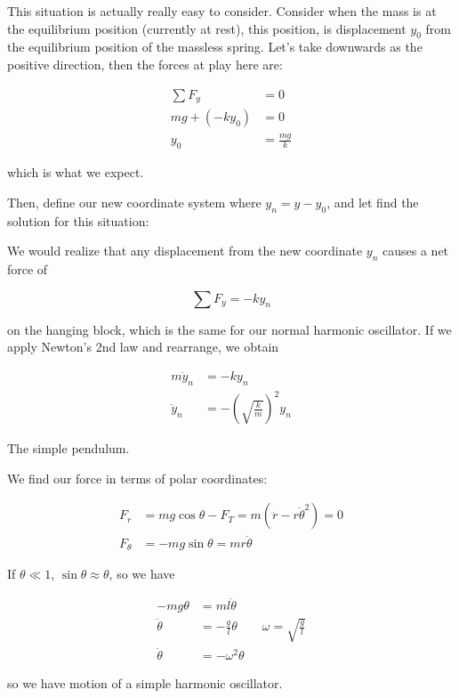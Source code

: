 \begin{sol}
	This situation is actually really easy to consider. Consider when the mass is at the equilibrium position (currently at rest), this position, is displacement $y_0$ from the equilibrium position of the massless spring. Let's take downwards as the positive direction, then the forces at play here are:

	\begin{align}
		\sum F_y &= 0\\
		mg + (-ky_0) &= 0\\
		y_0 &= \frac{mg}{k}
	\end{align}

	which is what we expect.

	Then, define our new coordinate system where $y_n = y - y_0$, and let find the solution for this situation:

	We would realize that any displacement from the new coordinate $y_n$ causes a net force of

	\begin{equation}
		\sum F_y = - k y_n
	\end{equation}
	
	on the hanging block, which is the same for our normal harmonic oscillator. If we apply Newton's 2nd law and rearrange, we obtain

	\begin{align}
		m \ddot y_n &= - k y_n\\
		\ddot y_n &= - \left(\sqrt{\frac{k}{m}}\right)^2 y_n
	\end{align}
\end{sol}	

\begin{example}
	The simple pendulum.
\end{example}

\begin{sol}
	We find our force in terms of polar coordinates:

	\begin{align}
		F_r &= mg\cos\theta - F_T = m (\ddot r - r\dot\theta^2) = 0\\
		F_\theta &= -mg\sin\theta = mr\ddot\theta
	\end{align}

	If $\theta \ll 1$, $\sin\theta \approx \theta$, so we have

	\begin{align}
		-mg\theta &= ml \ddot \theta\\
		\ddot \theta &= - \frac{g}{l}\theta \qquad \omega = \sqrt{\frac{g}{l}}\\
		\ddot \theta &= - \omega^2\theta
	\end{align}
	
	so we have motion of a simple harmonic oscillator.
\end{sol}